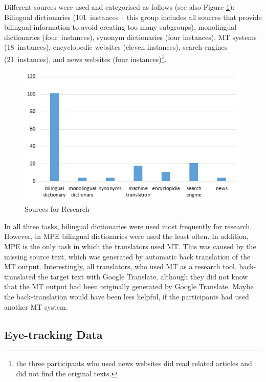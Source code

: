 \documentclass[output=paper]{langsci/langscibook}
\begin{document}
Different sources were used and categorised as follows (see also Figure \ref{fig:1}): Bilingual dictionaries (101~instances – this group includes all sources that provide bilingual information to avoid creating too many subgroups), monolingual dictionaries (four~instances), synonym dictionaries (four instances), MT systems (18~instances), encyclopedic websites (eleven instances), search engines (21~instances), and news websites (four instances)\footnote{the three participants who used news websites did read related articles and did not find the original texts.}.




 
\begin{figure}[h]
 \includegraphics[width=\textwidth]{figures/Nitzke1.png}
 \caption{Sources for Research}
 \label{fig:1}
\end{figure} 


In all three tasks, bilingual dictionaries were used most frequently for research. However, in MPE bilingual dictionaries were used the least often. In addition, MPE is the only task in which the translators used MT. This was caused by the missing source text, which was generated by automatic back translation of the MT output. Interestingly, all translators, who used MT as a research tool, back-translated the target text with Google Translate, although they did not know that the MT output had been originally generated by Google Translate. Maybe the back-translation would have been less helpful, if the participants had used another MT system.


\subsection{Eye-tracking Data}
\end{document}
